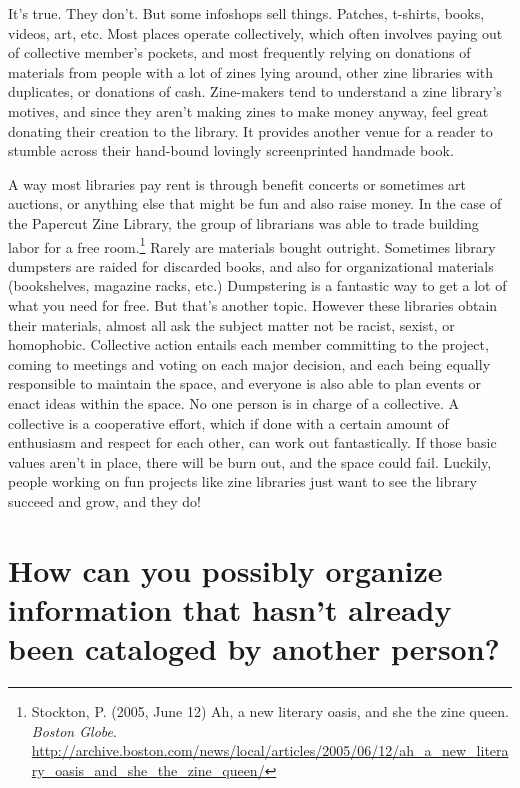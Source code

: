 \documentclass[output=paper]{langscibook}
\begin{document}
It's true. They don't. But some infoshops sell things. Patches,
t-shirts, books, videos, art, etc. Most places operate collectively,
which often involves paying out of collective member's pockets, and most
frequently relying on donations of materials from people with a lot of
zines lying around, other zine libraries with duplicates, or donations
of cash. Zine-makers tend to understand a zine library's motives, and
since they aren't making zines to make money anyway, feel great donating
their creation to the library. It provides another venue for a reader to
stumble across their hand-bound lovingly screenprinted handmade book.

A way most libraries pay rent is through benefit concerts or sometimes
art auctions, or anything else that might be fun and also raise money.
In the case of the Papercut Zine Library, the group of librarians was
able to trade building labor for a free room.\footnote{Stockton, P.
  (2005, June 12) Ah, a new literary oasis, and she the zine queen.
  \emph{Boston Globe}.
  \url{http://archive.boston.com/news/local/articles/2005/06/12/ah_a_new_literary_oasis_and_she_the_zine_queen/}}
Rarely are materials bought outright. Sometimes library dumpsters are
raided for discarded books, and also for organizational materials
(bookshelves, magazine racks, etc.) Dumpstering is a fantastic way to
get a lot of what you need for free. But that's another topic. However
these libraries obtain their materials, almost all ask the subject
matter not be racist, sexist, or homophobic. Collective action entails
each member committing to the project, coming to meetings and voting on
each major decision, and each being equally responsible to maintain the
space, and everyone is also able to plan events or enact ideas within
the space. No one person is in charge of a collective. A collective is a
cooperative effort, which if done with a certain amount of enthusiasm
and respect for each other, can work out fantastically. If those basic
values aren't in place, there will be burn out, and the space could
fail. Luckily, people working on fun projects like zine libraries just
want to see the library succeed and grow, and they do!

\hypertarget{how-can-you-possibly-organize-information-that-hasnt-already-been-cataloged-by-another-person}{%
\section*{How can you possibly organize information that hasn't already
been cataloged by another
person?}\label{how-can-you-possibly-organize-information-that-hasnt-already-been-cataloged-by-another-person}}
\end{document}
